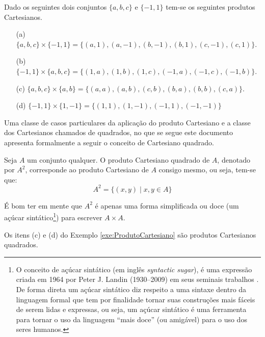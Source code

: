 \begin{exemplo}\label{exe:ProdutoCartesiano}
    Dado os seguintes dois conjuntos $\{a, b, c\}$ e $\{-1, 1\}$ tem-se os seguintes produtos Cartesianos.
    \begin{itemize}
        \item[(a)] $\{a, b, c\} \times \{-1, 1\} = \{(a, 1), (a, -1), (b, -1), (b, 1), (c, -1), (c, 1)\}$.
        \item[(b)] $\{-1, 1\} \times \{a, b, c\} = \{(1, a), (1, b), (1, c), (-1, a), (-1, c), (-1, b)\}$.
        \item[(c)] $\{a, b, c\} \times \{a, b\} = \{(a, a), (a, b), (c, b), (b, a), (b, b), (c, a)\}$.
        \item[(d)] $\{-1, 1\} \times \{1, -1\} = \{(1, 1), (1, -1), (-1, 1), (-1, -1)\}$ 
    \end{itemize}
\end{exemplo}

Uma classe de casos particulares da aplicação do produto Cartesiano e a classe dos Cartesianos chamados de quadrados, no que se segue este documento apresenta formalmente a seguir o conceito de Cartesiano quadrado.

\begin{definicao}\label{def:CartesianoQuadrado}
    Seja $A$ um conjunto qualquer. O produto Cartesiano quadrado de $A$, denotado por $A^2$, corresponde ao produto Cartesiano de $A$ consigo mesmo, ou seja, tem-se que:
    \begin{equation*}
        A^2 = \{(x, y) \mid x,y \in A\}
    \end{equation*}
\end{definicao}

\begin{atencao}
    É bom ter em mente que $A^2$ é apenas uma forma simplificada ou doce (um açúcar sintático\footnote{O conceito de açúcar sintático (em inglês \textit{syntactic sugar}), é uma expressão criada em 1964 por Peter J. Landin (1930--2009) em seus seminais trabalhos \cite{landin1964,landin1965-1,landin1965-2}. De forma direta um açúcar sintático diz respeito a uma sintaxe dentro da linguagem formal que tem por finalidade tornar suas construções mais fáceis de serem lidas e expressas, ou seja, um açúcar sintático é uma ferramenta para tornar o uso da linguagem “mais doce” (ou amigável) para o uso dos seres humanos.}) para escrever $A \times A$.
\end{atencao}


\begin{exemplo}\label{exe:CartesianoQuadrado}
    Os itens (c) e (d) do Exemplo \ref{exe:ProdutoCartesiano} são produtos Cartesianos quadrados.
\end{exemplo}

